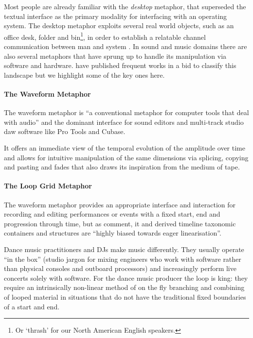 Most people are already familiar with the \textit{desktop} metaphor, that superseded the textual interface as the primary modality for interfacing with an operating system. The desktop metaphor exploits several real world objects, such as an office desk, folder and bin\footnote{Or `thrash' for our North American English speakers.}, in order to establish a relatable channel communication between man and system \citep{Helander2014}. In sound and music domains there are also several metaphors that have sprung up to handle its manipulation via software and hardware. \cite{Duignan2010, fels2002mapping} have published frequent works in a bid to classify this landscape but we highlight some of the key ones here.

\paragraph{The Waveform Metaphor}

The waveform metaphor is ``a conventional metaphor for computer tools that deal with audio'' \citep{Duignan2004} and the dominant interface for sound editors and multi-track studio \acrshort{daw} software like Pro Tools and Cubase.

It offers an immediate view of the temporal evolution of the amplitude over time and allows for intuitive manipulation of the same dimensions via splicing, copying and pasting and fades that also draws its inspiration from the medium of tape. 

\paragraph{The Loop Grid Metaphor}

The waveform metaphor provides an appropriate interface and interaction for recording and editing performances or events with a fixed start, end and progression through time, but as  \citep{Duignan2005} comment, it and derived timeline taxonomic containers and structures are ``highly biased towards eager linearisation''.

Dance music practitioners and DJs make music differently. They usually operate ``in the box'' (studio jargon for mixing engineers who work with software rather than physical consoles and outboard processors) and increasingly perform live concerts solely with software. For the dance music producer the loop is king: they require an intrinsically non-linear method of on the fly branching and combining of looped material in situations that do not have the traditional fixed boundaries of a start and end. 

